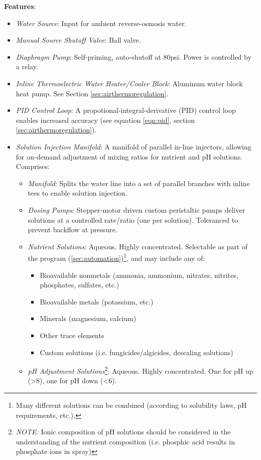 \textbf{Features}:
\begin{itemize}
    \item \textit{Water Source}: Input for ambient reverse-osmosis water.
    \item \textit{Manual Source Shutoff Valve}: Ball valve.
    \item \textit{Diaphragm Pump}: Self-priming, auto-shutoff at 80psi. Power is controlled by a relay.
    \item \textit{Inline Thermoelectric Water Heater/Cooler Block}: Aluminum water block heat pump. See Section \ref{sec:airthermoregulation}.
    \item \textit{PID Control Loop}: A propotional-integral-derivative (PID) control loop enables increased accuracy (see equation \ref{eqn:pid}, section \ref{sec:airthermoregulation}).
    \item \textit{Solution Injection Manifold}: A manifold of parallel in-line injectors, allowing for on-demand adjustment of mixing ratios for nutrient and pH solutions. Comprises:
    \begin{itemize}
        \item \textit{Manifold}: Splits the water line into a set of parallel branches with inline tees to enable solution injection.
        \item \textit{Dosing Pumps}: Stepper-motor driven custom peristaltic pumps deliver solutions at a controlled rate/ratio (one per solution). Toleranced to prevent backflow at pressure. %
        \item \textit{Nutrient Solutions}: Aqueous. Highly concentrated. Selectable as part of the program (\ref{sec:automation})\footnote{Many different solutions can be combined (according to solubility laws, pH requirements, etc.).}, and may include any of:
        \begin{itemize}
            \item Bioavailable nonmetals (ammonia, ammonium, nitrates, nitrites, phosphates, sulfates, etc.)
            \item Bioavailable metals (potassium, etc.)
            \item Minerals (magnesium, calcium)
            \item Other trace elements
            \item Custom solutions (i.e. fungicides/algicides, descaling solutions)
        \end{itemize} 
        \item \textit{pH Adjustment Solutions}\footnote{\textit{NOTE:} Ionic composition of pH solutions should be considered in the understanding of the nutrient composition (i.e. phosphic acid results in phosphate ions in spray)}: Aqueous. Highly concentrated. One for pH up (>8), one for pH down (<6).

\end{itemize}
\end{itemize}
